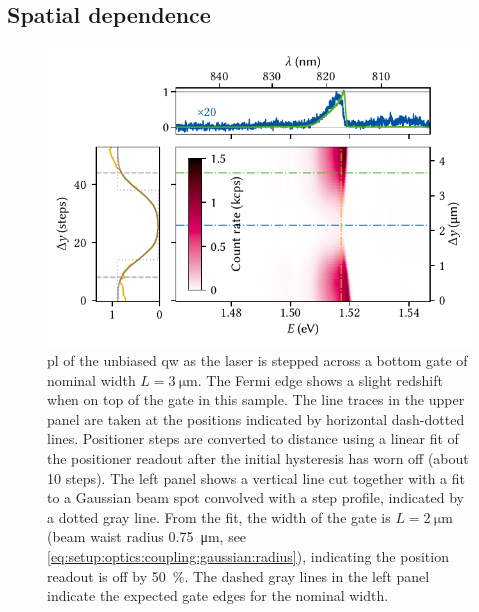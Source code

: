 \subsection{Spatial dependence}\label{subsec:exp:observations:pl:spatial}
\begin{figure}
    \centering
    \includegraphics{img/pdf/experiment/fig_F10_positioning}
    \caption[
        $V_{y}=\qty{30}{\volt}$
        \protect\newline
    ]{
        \Gls{pl} of the unbiased \gls{qw} as the laser is stepped across a bottom gate of nominal width $L = \qty{3}{\micro\meter}$.
        The Fermi edge shows a slight redshift when on top of the gate in this sample.
        The line traces in the upper panel are taken at the positions indicated by horizontal dash-dotted lines.
        Positioner steps are converted to distance using a linear fit of the positioner readout after the initial hysteresis has worn off (about \num{10} steps).
        The left panel shows a vertical line cut together with a fit to a Gaussian beam spot convolved with a step profile, indicated by a dotted gray line.
        From the fit, the width of the gate is $L = \qty{2}{\micro\meter}$ (beam waist radius \qty{0.75}{\micro\meter}, see \cref{eq:setup:optics:coupling:gaussian:radius}), indicating the position readout is off by \qty{50}{\percent}.
        The dashed gray lines in the left panel indicate the expected gate edges for the nominal width.
    }
    \label{fig:exp:pl:fig_F10_positioning}
\end{figure}

